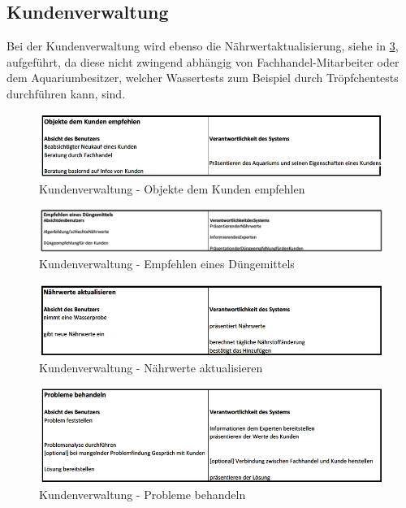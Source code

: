 \subsection{Kundenverwaltung}
Bei der Kundenverwaltung wird ebenso die Nährwertaktualisierung, siehe in \ref{euc:ku:3}, aufgeführt, da diese nicht zwingend abhängig von Fachhandel-Mitarbeiter oder dem Aquariumbesitzer, welcher Wassertests zum Beispiel durch Tröpfchentests durchführen kann, sind. 

\begin{figure}
	\centering
	\includegraphics[width=\linewidth,height=\textheight,
keepaspectratio]{euc_ku_1}
	\caption{Kundenverwaltung - Objekte dem Kunden empfehlen}
	\label{euc:ku:1}
\end{figure}

\begin{figure}
	\centering
	\includegraphics[width=\linewidth,height=\textheight,
keepaspectratio]{euc_ku_2}
	\caption{Kundenverwaltung - Empfehlen eines Düngemittels}
	\label{euc:ku:2}
\end{figure}

\begin{figure}
	\centering
	\includegraphics[width=\linewidth,height=\textheight,
keepaspectratio]{euc_ku_3}
	\caption{Kundenverwaltung - Nährwerte aktualisieren}
	\label{euc:ku:3}
\end{figure}

\begin{figure}
	\centering
	\includegraphics[width=\linewidth,height=\textheight,
keepaspectratio]{euc_ku_4}
	\caption{Kundenverwaltung - Probleme behandeln}
	\label{euc:ku:4}
\end{figure}



